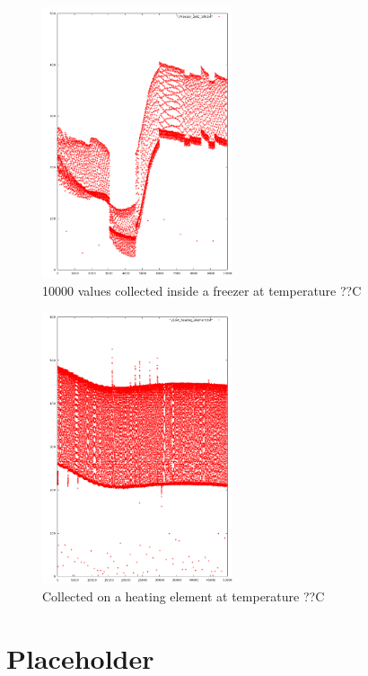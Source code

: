 \documentclass[10pt,a4paper]{article}
\begin{document}
\begin{figure}[H!]
  \caption{10000 values collected inside a freezer at temperature ??C} %
  \centering
  \includegraphics[width=0.5\textwidth]{img/Freezer10k.png}
\end{figure}

\begin{figure}[H!]
  \caption{Collected on a heating element at temperature ??C} %
  \centering
  \includegraphics[width=0.5\textwidth]{img/Heating50k.png}
\end{figure}


\section{Placeholder}

\cite{anthes2011} \cite{airturb} \cite{nist} \cite{intel} \cite{atmegads} \cite{menezes1996} \cite{schneier1996} \cite{maurer1998}

{}

\end{document}
